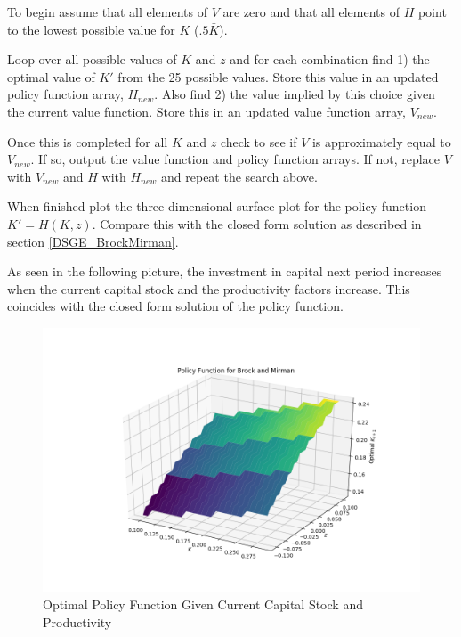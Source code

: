 \documentclass[letterpaper,11pt]{article}
\theoremstyle{definition}
\begin{document}
\begin{spacing}{1.5}
\begin{Exercise}
		To begin assume that all elements of $V$ are zero and that all elements of $H$ point to the lowest possible value for $K$ ($.5 \bar K$).

		Loop over all possible values of $K$ and $z$ and for each combination find 1) the optimal value of $K'$ from the 25 possible values.  Store this value in an updated policy function array, $H_{new}$.  Also find 2) the value implied by this choice given the current value function.  Store this in an updated value function array, $V_{new}$.

		Once this is completed for all $K$ and $z$ check to see if $V$ is approximately equal to $V_{new}$.  If so, output the value function and policy function arrays.  If not, replace $V$ with $V_{new}$ and $H$ with $H_{new}$ and repeat the search above.

		When finished plot the three-dimensional surface plot for the policy function $K' = H(K,z)$.  Compare this with the closed form solution as described in section \ref{DSGE_BrockMirman}.
	\end{Exercise}

	As seen in the following picture, the investment in capital next period increases when the current capital stock and the productivity factors increase. This coincides with the closed form solution of the policy function.

	\begin{figure}[H]
		\caption{Optimal Policy Function Given Current Capital Stock and Productivity}
		\label{fig:brock_and_mirman}
		\includegraphics[width=\textwidth]{Brock_and_Merman_policy.png}
	\end{figure}


\end{spacing}
\end{document}
